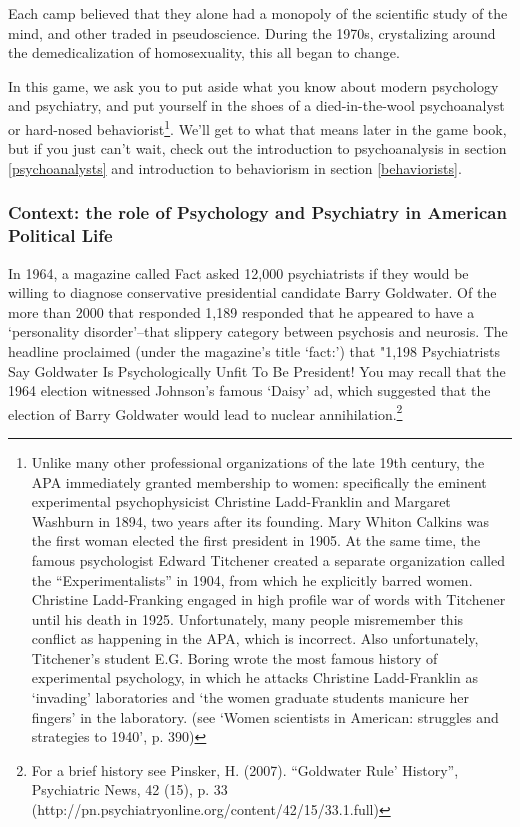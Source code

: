 Each camp believed that they alone had a monopoly of the scientific study of the mind, and other traded in pseudoscience. During the 1970s, crystalizing around the demedicalization of homosexuality, this all began to change. 

In this game, we ask you to put aside what you know about modern psychology and psychiatry, and put yourself in the shoes of a died-in-the-wool psychoanalyst or hard-nosed behaviorist\footnote{Unlike many other professional organizations of the late 19th century, the APA immediately granted membership to women: specifically the eminent experimental psychophysicist Christine Ladd-Franklin and Margaret Washburn in 1894, two years after its founding. Mary Whiton Calkins was the first woman elected the first president in 1905.⁠
At the same time, the famous psychologist Edward Titchener created a separate organization called the ``Experimentalists'' in 1904, from which he explicitly barred women. Christine Ladd-Franking engaged in high profile war of words with Titchener until his death in 1925. Unfortunately, many people misremember this conflict as happening in the APA, which is incorrect. Also unfortunately, Titchener's student E.G. Boring wrote the most famous history of experimental psychology, in which he attacks Christine Ladd-Franklin as `invading' laboratories and `the women graduate students manicure her fingers' in the laboratory. (see `Women scientists in American: struggles and strategies to 1940', p. 390)}. We'll get to what that means later in the game book, but if you just can't wait, check out the introduction to psychoanalysis in section \ref{psychoanalysts} and introduction to behaviorism in section \ref{behaviorists}.

\subsubsection{Context: the role of Psychology and Psychiatry in American Political Life}
\label{context:theroleofpsychologyandpsychiatryinamericanpoliticallife}

In 1964, a magazine called Fact asked 12,000 psychiatrists if they would be willing to diagnose conservative presidential candidate Barry Goldwater. Of the more than 2000 that responded 1,189 responded that he appeared to have a `personality disorder'--that slippery category between psychosis and neurosis. The headline proclaimed (under the magazine's title `fact:') that "1,198 Psychiatrists Say Goldwater Is Psychologically Unfit To Be President! You may recall that the 1964 election witnessed Johnson's famous `Daisy' ad, which suggested that the election of Barry Goldwater would lead to nuclear annihilation.\footnote{For a brief history see Pinsker, H. (2007). ``Goldwater Rule' History'', Psychiatric News, 42 (15), p. 33 (http:\slash \slash pn.psychiatryonline.org\slash content\slash 42\slash 15\slash 33.1.full)} 

